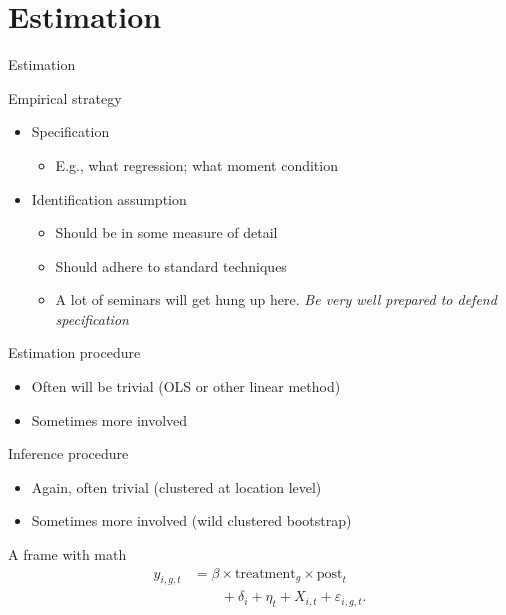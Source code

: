 \documentclass[aspectratio=169, 11pt]{beamer}
\begin{document}
\section{Estimation}

\begin{frame}{Estimation}

    \small
    Empirical strategy\\
    \begin{itemize}
        \item Specification
        \begin{itemize}
            \item E.g., what regression; what moment condition
        \end{itemize}
        \item Identification assumption
        \begin{itemize}
            \item Should be in some measure of detail
            \item Should adhere to standard techniques
            \item A lot of seminars will get hung up here. \emph{Be very well prepared to defend specification}
        \end{itemize}
    \end{itemize}
    
    Estimation procedure\\
    \begin{itemize}
        \item Often will be trivial (OLS or other linear method)
        \item Sometimes more involved
    \end{itemize}
    
    Inference procedure\\
    \begin{itemize}
        \item Again, often trivial (clustered at location level)
        \item Sometimes more involved (wild clustered bootstrap)
    \end{itemize}
\end{frame}

\begin{frame}{A frame with math}
    \begin{equation}
    \begin{aligned}
        y_{i,g,t} &= \beta \times \text{treatment}_g \times \text{post}_t \\
        &\qquad + \delta_i + \eta_t + X_{i,t} + \varepsilon_{i,g,t}.
    \end{aligned}
    \end{equation}
\end{frame}
\end{document}
